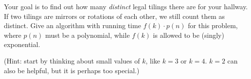 \documentclass[10pt]{article}
\begin{document}




Your goal is to find out how many \emph{distinct} legal tilings there
are for your hallway.
If two tilings are mirrors or rotations of each other, we still count
them as distinct.
Give an algorithm with running time $f(k) \cdot p(n)$ for this
problem, where $p(n)$ must be a polynomial, while $f(k)$ is allowed to
be (singly) exponential.

(Hint: start by thinking about small values of $k$, like $k=3$ or $k=4$. $k=2$ can also be helpful, but it is perhaps too special.)
\end{document}
